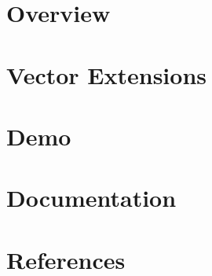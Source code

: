 \documentclass[
]{scrbook}
\begin{document}
\sloppy                         %


\tableofcontents  
\thispagestyle{empty}

% 

\part[Overview]{Overview\sdot}





\part[Vector Extensions]{Vector Extensions\sdot}





\part[Demo]{Demo\sdot}




\part[Documentation]{Documentation\sdot}





\part[References]{References\sdot}

% 
% 
% 
\end{document}
